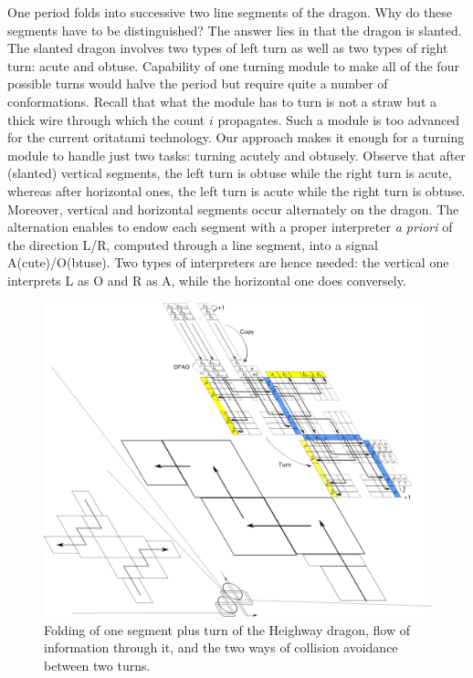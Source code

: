 One period folds into successive two line segments of the dragon. 
Why do these segments have to be distinguished? 
The answer lies in that the dragon is slanted. 
The slanted dragon involves two types of left turn as well as two types of right turn: acute and obtuse. 
Capability of one turning module to make all of the four possible turns would halve the period but require quite a number of conformations. 
Recall that what the module has to turn is not a straw but a thick wire through which the count $i$ propagates. 
Such a module is too advanced for the current oritatami technology.  
Our approach makes it enough for a turning module to handle just two tasks: turning acutely and obtusely. 
Observe that after (slanted) vertical segments, the left turn is obtuse while the right turn is acute, whereas after horizontal ones, the left turn is acute while the right turn is obtuse. 
Moreover, vertical and horizontal segments occur alternately on the dragon. 
The alternation enables to endow each segment with a proper interpreter \textit{a priori} of the direction L/R, computed through a line segment, into a signal A(cute)/O(btuse).  
Two types of interpreters are hence needed: the vertical one interprets L as O and R as A, while the horizontal one does conversely. 

\begin{figure}[tb]
\includegraphics[width=\linewidth]{pic/dragon_vol4.pdf}
\caption{
Folding of one segment plus turn of the Heighway dragon, flow of information through it, and the two ways of collision avoidance between two turns.
}
\label{fig:abst_dragon}
\end{figure}

